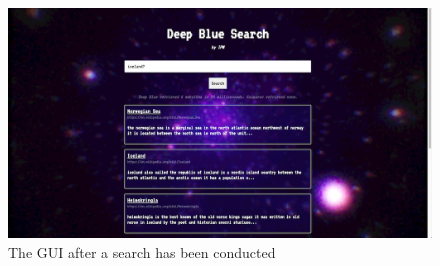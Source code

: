 \begin{figure}[h]
	\centering
	\includegraphics[width=\textwidth]{graphics/gui.png}
	\caption{The GUI after a search has been conducted}
	\label{fig:gui:results}
\end{figure}